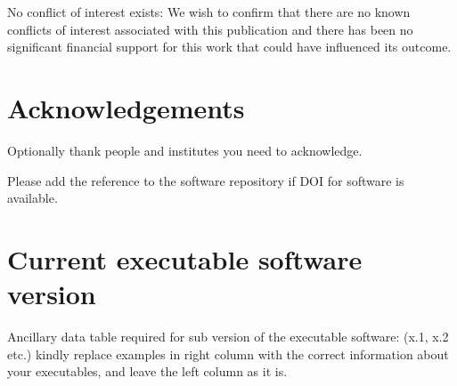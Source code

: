 \documentclass[preprint,12pt, a4paper]{elsarticle}
\begin{document}
No conflict of interest exists:
We wish to confirm that there are no known conflicts of interest associated with this publication and there has been no significant financial support for this work that could have influenced its outcome.


\section*{Acknowledgements}
\label{}

Optionally thank people and institutes you need to acknowledge. 





\begin{thebibliography}{00}



\bibitem{}

\end{thebibliography}
Please add the reference to the software repository if DOI for software  is available. 

\section*{Current executable software version}
\label{}

Ancillary data table required for sub version of the executable software: (x.1, x.2 etc.) kindly replace examples in right column with the correct information about your executables, and leave the left column as it is.
\end{document}
